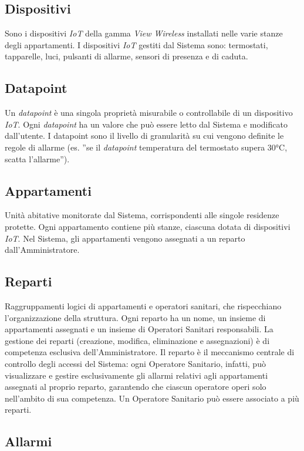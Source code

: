 \documentclass[10pt, letterpaper]{article}
\newcommand{\admin}{Amministratore\xspace}
\begin{document}
\subsection{Dispositivi}
Sono i dispositivi \textit{IoT} della gamma \textit{View Wireless} installati nelle varie stanze degli appartamenti. 
I dispositivi \textit{IoT} gestiti dal Sistema sono: termostati, tapparelle, luci, pulsanti di allarme, sensori di presenza e di caduta.

\subsection{Datapoint}
Un \textit{datapoint} è una singola proprietà misurabile o controllabile di un 
dispositivo \textit{IoT}.
Ogni \textit{datapoint} ha un valore che può essere letto dal Sistema e modificato dall'utente. 
I datapoint sono il livello di granularità su cui vengono definite le regole 
di allarme (es. ''se il \textit{datapoint} temperatura del termostato supera 30°C, 
scatta l'allarme'').

\subsection{Appartamenti}
Unità abitative monitorate dal Sistema, corrispondenti alle singole 
residenze protette. 
Ogni appartamento contiene più stanze, ciascuna dotata di dispositivi \textit{IoT}. 
Nel Sistema, gli appartamenti vengono assegnati a un reparto dall'\admin.

\subsection{Reparti}
Raggruppamenti logici di appartamenti e operatori sanitari, 
che rispecchiano l'organizzazione della struttura. 
Ogni reparto ha un nome, un insieme di appartamenti assegnati e un 
insieme di Operatori Sanitari responsabili. 
La gestione dei reparti (creazione, modifica, eliminazione e assegnazioni) 
è di competenza esclusiva dell'\admin.
Il reparto è il meccanismo centrale di controllo degli accessi del Sistema: 
ogni Operatore Sanitario, infatti, può visualizzare e gestire esclusivamente 
gli allarmi relativi agli appartamenti assegnati al proprio reparto, 
garantendo che ciascun operatore operi solo nell'ambito di sua competenza.
Un Operatore Sanitario può essere associato a più reparti.

\subsection{Allarmi}
\end{document}

